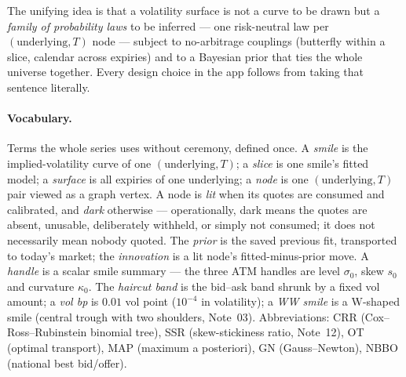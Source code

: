 \documentclass[11pt]{article}
\begin{document}
\begin{heuristic}
The unifying idea is that a volatility surface is not a curve to be drawn but a
\emph{family of probability laws} to be inferred --- one risk-neutral law per
$(\text{underlying},T)$ node --- subject to no-arbitrage couplings (butterfly
within a slice, calendar across expiries) and to a Bayesian prior that ties the
whole universe together. Every design choice in the app follows from taking that
sentence literally.
\end{heuristic}

\paragraph{Vocabulary.} Terms the whole series uses without ceremony, defined
once. A \emph{smile} is the implied-volatility curve of one
$(\text{underlying},T)$; a \emph{slice} is one smile's fitted model; a
\emph{surface} is all expiries of one underlying; a \emph{node} is one
$(\text{underlying},T)$ pair viewed as a graph vertex. A node is \emph{lit}
when its quotes are consumed and calibrated, and \emph{dark} otherwise ---
operationally, dark means the quotes are absent, unusable, deliberately
withheld, or simply not consumed; it does not necessarily mean nobody quoted.
The \emph{prior} is the saved previous fit, transported to today's market; the
\emph{innovation} is a lit node's fitted-minus-prior move. A \emph{handle} is a
scalar smile summary --- the three ATM handles are level $\sigma_0$, skew $s_0$
and curvature $\kappa_0$. The \emph{haircut band} is the bid--ask band shrunk
by a fixed vol amount; a \emph{vol bp} is $0.01$ vol point ($10^{-4}$ in
volatility); a \emph{WW smile} is a W-shaped smile (central trough with two
shoulders, Note~03). Abbreviations: CRR (Cox--Ross--Rubinstein binomial tree),
SSR (skew-stickiness ratio, Note~12), OT (optimal transport), MAP (maximum a
posteriori), GN (Gauss--Newton), NBBO (national best bid/offer).
\end{document}
